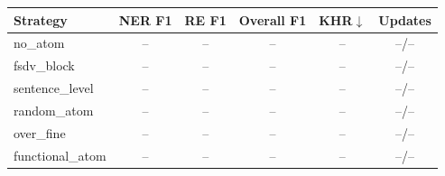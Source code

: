 \begin{tabular}{lccccc}
\toprule
Strategy & NER F1 & RE F1 & Overall F1 & KHR$\downarrow$ & Updates \\
\midrule
no_atom & -- & -- & -- & -- & --/-- \\
fsdv_block & -- & -- & -- & -- & --/-- \\
sentence_level & -- & -- & -- & -- & --/-- \\
random_atom & -- & -- & -- & -- & --/-- \\
over_fine & -- & -- & -- & -- & --/-- \\
functional_atom & -- & -- & -- & -- & --/-- \\
\bottomrule
\end{tabular}
